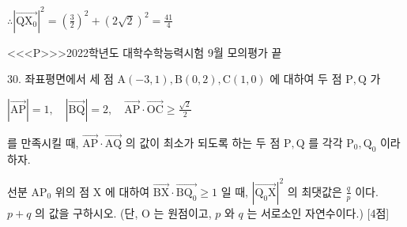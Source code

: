 \documentclass{oblivoir}
\begin{document}
$\therefore\left|\overrightarrow{\mathrm{Q} \mathrm{X}_{0}}\right|^{2}=\left(\frac{3}{2}\right)^{2}+(2 \sqrt{2})^{2}=\frac{41}{4}$


<<<P>>>2022학년도 대학수학능력시험 9월 모의평가 끝

30. 좌표평면에서 세 점 $\mathrm{A}(-3,1), \mathrm{B}(0,2), \mathrm{C}(1,0)$ 에 대하여 두 점 $\mathrm{P}, \mathrm{Q}$ 가

$|\overrightarrow{\mathrm{AP}}|=1, \quad|\overrightarrow{\mathrm{BQ}}|=2, \quad \overrightarrow{\mathrm{AP}} \cdot \overrightarrow{\mathrm{OC}} \geq \frac{\sqrt{2}}{2}$

를 만족시킬 때, $\overrightarrow{\mathrm{AP}} \cdot \overrightarrow{\mathrm{AQ}}$ 의 값이 최소가 되도록 하는 두 점 $\mathrm{P}, \mathrm{Q}$ 를 각각 $\mathrm{P}_{0}, \mathrm{Q}_{0}$ 이라 하자.

선분 $\mathrm{AP}_{0}$ 위의 점 $\mathrm{X}$ 에 대하여 $\overrightarrow{\mathrm{BX}} \cdot \overrightarrow{\mathrm{BQ}_{0}} \geq 1$ 일 때, $\left|\overrightarrow{\mathrm{Q}_{0} \mathrm{X}}\right|^{2}$ 의 최댓값은 $\frac{q}{p}$ 이다. $p+q$ 의 값을 구하시오. (단, $\mathrm{O}$ 는 원점이고, $p$ 와 $q$ 는 서로소인 자연수이다.) [4점]
\end{document}
